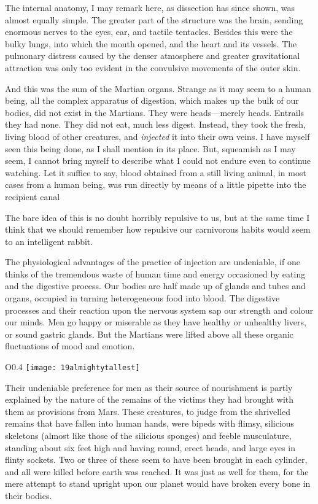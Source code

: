 The internal anatomy, I may remark here, as dissection has since shown, was almost equally simple. The greater part of the structure was the brain, sending enormous nerves to the eyes, ear, and tactile tentacles. Besides this were the bulky lungs, into which the mouth opened, and the heart and its vessels. The pulmonary distress caused by the denser atmosphere and greater gravitational attraction was only too evident in the convulsive movements of the outer skin.

And this was the sum of the Martian organs. Strange as it may seem to a human being, all the complex apparatus of digestion, which makes up the bulk of our bodies, did not exist in the Martians. They were heads—merely heads. Entrails they had none. They did not eat, much less digest. Instead, they took the fresh, living blood of other creatures, and \textit{injected} it into their own veins. I have myself seen this being done, as I shall mention in its place. But, squeamish as I may seem, I cannot bring myself to describe what I could not endure even to continue watching. Let it suffice to say, blood obtained from a still living animal, in most cases from a human being, was run directly by means of a little pipette into the recipient canal\textellipsis

The bare idea of this is no doubt horribly repulsive to us, but at the same time I think that we should remember how repulsive our carnivorous habits would seem to an intelligent rabbit.

The physiological advantages of the practice of injection are undeniable, if one thinks of the tremendous waste of human time and energy occasioned by eating and the digestive process. Our bodies are half made up of glands and tubes and organs, occupied in turning heterogeneous food into blood. The digestive processes and their reaction upon the nervous system sap our strength and colour our minds. Men go happy or miserable as they have healthy or unhealthy livers, or sound gastric glands. But the Martians were lifted above all these organic fluctuations of mood and emotion.

\begin{wrapfigure}{O}{0.4\textwidth}
\centering
\texttt{[image: 19almightytallest]}
\end{wrapfigure}

Their undeniable preference for men as their source of nourishment is partly explained by the nature of the remains of the victims they had brought with them as provisions from Mars. These creatures, to judge from the shrivelled remains that have fallen into human hands, were bipeds with flimsy, silicious skeletons (almost like those of the silicious sponges) and feeble musculature, standing about six feet high and having round, erect heads, and large eyes in flinty sockets. Two or three of these seem to have been brought in each cylinder, and all were killed before earth was reached. It was just as well for them, for the mere attempt to stand upright upon our planet would have broken every bone in their bodies.

